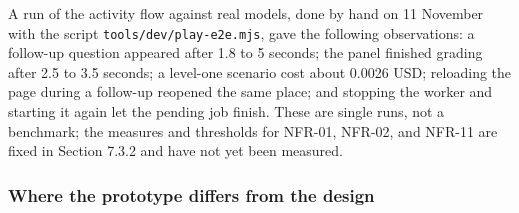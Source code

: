 A run of the activity flow against real models, done by hand on 11 November with the script \texttt{tools/\allowbreak{}dev/\allowbreak{}play-\allowbreak{}e2e.\allowbreak{}mjs}, gave the following observations: a follow-up question appeared after 1.8 to 5 seconds; the panel finished grading after 2.5 to 3.5 seconds; a level-one scenario cost about 0.0026 USD; reloading the page during a follow-up reopened the same place; and stopping the worker and starting it again let the pending job finish. These are single runs, not a benchmark; the measures and thresholds for NFR-01, NFR-02, and NFR-11 are fixed in Section 7.3.2 and have not yet been measured.

\subsubsection{Where the prototype differs from the design}

